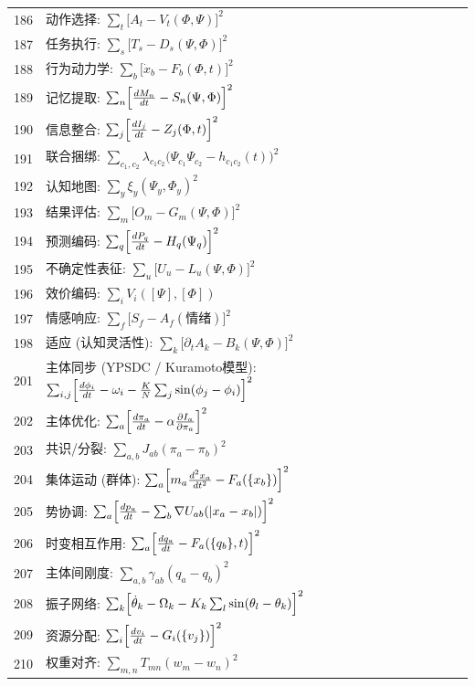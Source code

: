 \documentclass[11pt,a4paper]{article}
\begin{document}
\begin{longtable}{r l}
		186 & 动作选择: $\sum_t\bigl[A_t - V_t(\Phi,\Psi)\bigr]^2$ \\
		187 & 任务执行: $\sum_s\bigl[T_s - D_s(\Psi,\Phi)\bigr]^2$ \\
		188 & 行为动力学: $\sum_b\bigl[\dot x_b - F_b(\Phi,t)\bigr]^2$ \\
		189 & 记忆提取: $\sum_n\Bigl[\frac{dM_n}{dt} - S_n(\Psi,\Phi)\Bigr]^2$ \\
		190 & 信息整合: $\sum_j\Bigl[\frac{dI_j}{dt} - Z_j(\Phi,t)\Bigr]^2$ \\
		191 & 联合捆绑: $\sum_{c_1,c_2}\lambda_{c_1c_2}\bigl(\Psi_{c_1}\Psi_{c_2} - h_{c_1c_2}(t)\bigr)^2$ \\
		192 & 认知地图: $\sum_y\xi_y(\Psi_y,\Phi_y)^2$ \\
		193 & 结果评估: $\sum_m\bigl[O_m - G_m(\Psi,\Phi)\bigr]^2$ \\
		194 & 预测编码: $\sum_q\Bigl[\frac{dP_q}{dt} - H_q(\Psi_q)\Bigr]^2$ \\
		195 & 不确定性表征: $\sum_u\bigl[U_u - L_u(\Psi,\Phi)\bigr]^2$ \\
		196 & 效价编码: $\sum_i V_i([\Psi],[\Phi])$ \\
		197 & 情感响应: $\sum_f\bigl[S_f - A_f(\text{情绪})\bigr]^2$ \\
		198 & 适应 (认知灵活性): $\sum_k\bigl[\partial_t A_k - B_k(\Psi,\Phi)\bigr]^2$ \\
		201 & 主体同步 (YPSDC / Kuramoto模型): $\sum_{i,j}\Bigl[\frac{d\phi_i}{dt} - \omega_i - \frac{K}{N}\sum_j\sin(\phi_j-\phi_i)\Bigr]^2$ \\
		202 & 主体优化: $\sum_a\Bigl[\frac{d\pi_a}{dt} - \alpha\frac{\partial I_a}{\partial\pi_a}\Bigr]^2$ \\
		203 & 共识/分裂: $\sum_{a,b}J_{ab}(\pi_a - \pi_b)^2$ \\
		204 & 集体运动 (群体): $\sum_a\Bigl[m_a\frac{d^2 x_a}{dt^2} - F_a(\{x_b\})\Bigr]^2$ \\
		205 & 势协调: $\sum_a\Bigl[\frac{dp_a}{dt} - \sum_b\nabla U_{ab}(|x_a-x_b|)\Bigr]^2$ \\
		206 & 时变相互作用: $\sum_a\Bigl[\frac{dq_a}{dt} - F_a(\{q_b\},t)\Bigr]^2$ \\
		207 & 主体间刚度: $\sum_{a,b}\gamma_{ab}(q_a - q_b)^2$ \\
		208 & 振子网络: $\sum_k\Bigl[\dot\theta_k - \Omega_k - K_k\sum_l\sin(\theta_l-\theta_k)\Bigr]^2$ \\
		209 & 资源分配: $\sum_i\Bigl[\frac{dv_i}{dt} - G_i(\{v_j\})\Bigr]^2$ \\
		210 & 权重对齐: $\sum_{m,n}T_{mn}(w_m - w_n)^2$ \\

\end{longtable}
\end{document}
